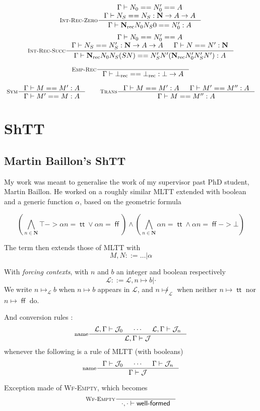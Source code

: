 \documentclass[11pt]{article}
\DeclareMathOperator{\rec}{rec}
\DeclareMathOperator{\true}{\mathsf{tt}}
\DeclareMathOperator{\false}{\mathsf{ff}}
\newcommand{\0}{\mathbf{0}}
\newcommand{\1}{\mathbf{1}}
\newcommand{\nat}{\mathbf{N}}
\newcommand{\tctx}{\Gamma}
\newcommand{\Wf}{\textsf{well-formed}}
\newcommand{\fctx}{\mathcal{L}}
\begin{document}
$$
    \inference[\textsc{Int-Rec-Zero}]{\tctx |- N_0 == N'_0 == A\\ \tctx |- N_S == N_S : \nat -> A  -> A}{\tctx |- \nat_{\rec} N_0N_S0 == N'_0 : A}
$$
$$
    \inference[\textsc{Int-Rec-Succ}]{\tctx |- N_0 == N'_0 == A\\ \tctx |- N_S == N'_S : \nat -> A  -> A & \tctx |- N == N' :\nat}{\tctx |- \nat_{\rec} N_0N_S (S N) == N'_S N' (\nat_{\rec}N'_0 N'_S N') : A}
$$


$$
    \inference[\textsc{Emp-Rec}]{}{\tctx |- \bot_{\rec} == \bot_{\rec} : \bot -> A}
$$

$$
    \inference[\textsc{Sym}]{\tctx |- M == M' : A}{\tctx |- M' == M : A} \qquad
    \inference[\textsc{Trans}]
    {\tctx |- M == M' :A & \tctx |- M' == M'' : A}{\tctx |- M == M'' : A}
$$

\section{ShTT}
\subsection{Martin Baillon's ShTT}\label{MBshtt}
My work was meant to generalise the work of my supervisor past PhD student, Martin Baillon. He worked on a roughly similar MLTT extended with boolean and a generic function $\alpha$, based on the geometric formula 

$$ \left(\bigwedge_{n\in\nat} \top -> \alpha n = \true \vee \alpha n = \false\right) \wedge \left(\bigwedge_{n\in \nat} \alpha n = \true \wedge \alpha n = \false -> \bot \right)$$

The term then extends those of MLTT with
$$ M, N ::= \dots |\alpha$$

With \emph{forcing contexts}, with $n$ and $b$ an integer and boolean respectively
$$ \fctx ::= \fctx, n \mapsto b | \cdot$$
We write $n\mapsto_\fctx b$ when $n\mapsto b$ appears in $\fctx$, and $n\not\mapsto_\fctx$ when neither $n\mapsto \true$ nor $n\mapsto \false$ do.

And conversion rules :
$$
    \inference[name]{\fctx,\tctx |- \mathcal{J}_0 & \cdots & \fctx,\tctx |- \mathcal{J}_n}{\fctx,\tctx |- \mathcal{J}}
$$
whenever the following is a rule of MLTT (with booleans)
$$
    \inference[name]{\tctx |- \mathcal{J}_0 & \cdots & \tctx |- \mathcal{J}_n}{\tctx |- \mathcal{J}}
$$

Exception made of \textsc{Wf-Empty}, which becomes
$$
    \inference[\textsc{Wf-Empty}]{}{\cdot,\cdot |- \Wf}
$$
\end{document}
